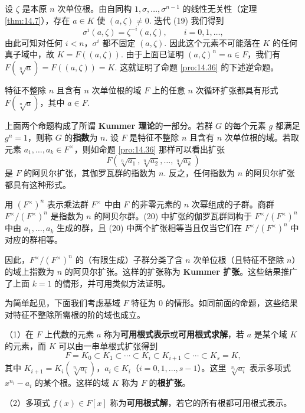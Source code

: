 设 \(\zeta\) 是本原 \(n\) 次单位根。由自同构 \(1, \sigma, \ldots, \sigma^{n-1}\) 的线性无关性（定理 \ref{thm:14.7}），存在 \(a \in K\) 使 \((a,\zeta) \neq 0\). 迭代 (19) 我们得到
\[
\sigma^i(a,\zeta) = \zeta^{-i}(a,\zeta), \qquad i = 0, 1, \ldots,
\]
由此可知对任何 \(i < n\)，\(\sigma^i\) 都不固定 \((a,\zeta)\). 因此这个元素不可能落在 \(K\) 的任何真子域中，故 \(K = F((a,\zeta))\). 由于上面已证明 \((a,\zeta)^n = a \in F\)，我们有 \(F(\sqrt[n]{a}) = F((a,\zeta)) = K\). 这就证明了命题 \ref{pro:14.36} 的下述逆命题。

\begin{proposition}\label{pro:14.37}
特征不整除 \(n\) 且含有 \(n\) 次单位根的域 \(F\) 上的任意 \(n\) 次循环扩张都具有形式 \(F(\sqrt[n]{a})\)，其中 \(a \in F\).
\end{proposition}

\begin{remark}
上面两个命题构成了所谓 \textbf{Kummer 理论}的一部分。若群 \(G\) 的每个元素 \(g\) 都满足 \(g^n = 1\)，则称 \(G\) 的\textbf{指数}为 \(n\). 设 \(F\) 是特征不整除 \(n\) 且含有 \(n\) 次单位根的域。若取元素 \(a_1, \ldots, a_k \in F^\times\)，则如命题 \ref{pro:14.36} 那样可以看出扩张
\[
F\left(\sqrt[n]{a_1}, \sqrt[n]{a_2}, \ldots, \sqrt[n]{a_k}\right) \tag{14.20}
\]
是 \(F\) 的阿贝尔扩张，其伽罗瓦群的指数为 \(n\). 反之，任何指数为 \(n\) 的阿贝尔扩张都具有这种形式。

用 \((F^\times)^n\) 表示乘法群 \(F^\times\) 中由 \(F\) 的非零元素的 \(n\) 次幂组成的子群。商群 \(F^\times/(F^\times)^n\) 是指数为 \(n\) 的阿贝尔群。(20) 中扩张的伽罗瓦群同构于 \(F^\times/(F^\times)^n\) 中由 \(a_1, \ldots, a_k\) 生成的群，且 (20) 中两个扩张相等当且仅当它们在 \(F^\times/(F^\times)^n\) 中对应的群相等。

因此，\(F^\times/(F^\times)^n\) 的（有限生成）子群分类了含 \(n\) 次单位根（且特征不整除 \(n\)）的域上指数为 \(n\) 的阿贝尔扩张。这样的扩张称为 \textbf{Kummer 扩张}。这些结果推广了上面 \(k = 1\) 的情形，并可用类似方法证明。
\end{remark}

为简单起见，下面我们考虑基域 \(F\) 特征为 0 的情形。如同前面的命题，这些结果对特征不整除所需根的阶的域也成立。

\begin{definition}
（1）在 \(F\) 上代数的元素 \(a\) 称为\textbf{可用根式表示}或\textbf{可用根式求解}，若 \(a\) 是某个域 \(K\) 的元素，而 \(K\) 可以由一串单根式扩张得到
\[
F = K_0 \subset K_1 \subset \cdots \subset K_i \subset K_{i+1} \subset \cdots \subset K_s = K, \tag{14.21}
\]
其中 \(K_{i+1} = K_i(\sqrt[n_i]{a_i})\)，\(a_i \in K_i\)（\(i = 0, 1, \ldots, s-1\)）。这里 \(\sqrt[n_i]{a_i}\) 表示多项式 \(x^{n_i}-a_i\) 的某个根。这样的域 \(K\) 称为 \(F\) 的\textbf{根扩张}。

（2）多项式 \(f(x) \in F[x]\) 称为\textbf{可用根式解}，若它的所有根都可用根式表示。
\end{definition}

